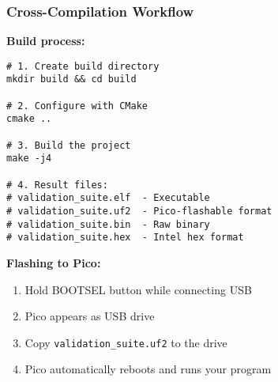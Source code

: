 \documentclass{beamer}
\begin{document}
\begin{frame}[fragile]
\frametitle{Cross-Compilation Workflow}
\textbf{Build process:}
\begin{verbatim}
# 1. Create build directory
mkdir build && cd build

# 2. Configure with CMake
cmake ..

# 3. Build the project
make -j4

# 4. Result files:
# validation_suite.elf  - Executable
# validation_suite.uf2  - Pico-flashable format
# validation_suite.bin  - Raw binary
# validation_suite.hex  - Intel hex format
\end{verbatim}

\textbf{Flashing to Pico:}
\begin{enumerate}
    \item Hold BOOTSEL button while connecting USB
    \item Pico appears as USB drive
    \item Copy \texttt{validation\_suite.uf2} to the drive
    \item Pico automatically reboots and runs your program
\end{enumerate}
\end{frame}
\end{document}
